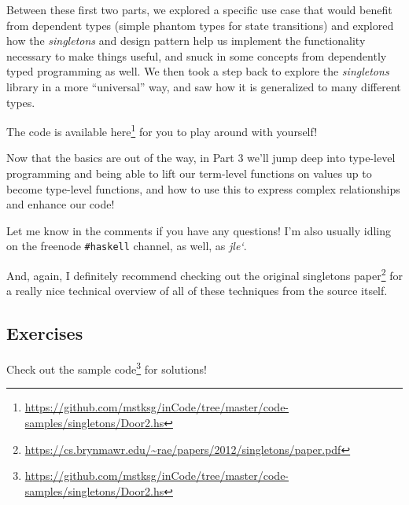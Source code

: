 \documentclass[]{article}
\renewcommand{\href}[2]{#2\footnote{\url{#1}}}
\begin{document}
Between these first two parts, we explored a specific use case that would
benefit from dependent types (simple phantom types for state transitions) and
explored how the \emph{singletons} and design pattern help us implement the
functionality necessary to make things useful, and snuck in some concepts from
dependently typed programming as well. We then took a step back to explore the
\emph{singletons} library in a more ``universal'' way, and saw how it is
generalized to many different types.

The code is available
\href{https://github.com/mstksg/inCode/tree/master/code-samples/singletons/Door2.hs}{here}
for you to play around with yourself!

Now that the basics are out of the way, in Part 3 we'll jump deep into
type-level programming and being able to lift our term-level functions on values
up to become type-level functions, and how to use this to express complex
relationships and enhance our code!

Let me know in the comments if you have any questions! I'm also usually idling
on the freenode \texttt{\#haskell} channel, as well, as \emph{jle`}.

And, again, I definitely recommend checking out the
\href{https://cs.brynmawr.edu/~rae/papers/2012/singletons/paper.pdf}{original
singletons paper} for a really nice technical overview of all of these
techniques from the source itself.

\subsection{Exercises}\label{exercises}

Check out the
\href{https://github.com/mstksg/inCode/tree/master/code-samples/singletons/Door2.hs}{sample
code} for solutions!
\end{document}
